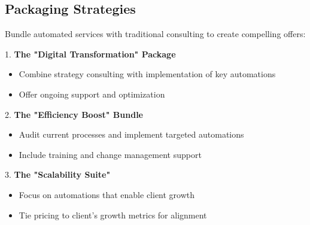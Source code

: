\subsection{Packaging Strategies}

Bundle automated services with traditional consulting to create compelling offers:

1. \textbf{The "Digital Transformation" Package}
\begin{itemize}
    \item Combine strategy consulting with implementation of key automations
    \item Offer ongoing support and optimization
\end{itemize}

2. \textbf{The "Efficiency Boost" Bundle}
\begin{itemize}
    \item Audit current processes and implement targeted automations
    \item Include training and change management support
\end{itemize}

3. \textbf{The "Scalability Suite"}
\begin{itemize}
    \item Focus on automations that enable client growth
    \item Tie pricing to client's growth metrics for alignment
\end{itemize}

